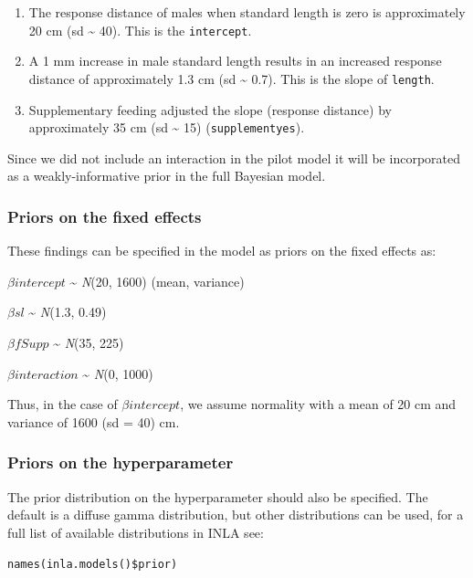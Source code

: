 \documentclass[
]{book}
\providecommand{\tightlist}{%
  \setlength{\itemsep}{0pt}\setlength{\parskip}{0pt}}
\begin{document}
\begin{enumerate}
\def\labelenumi{\arabic{enumi}.}
\tightlist
\item
  The response distance of males when standard length is zero is approximately 20 cm (sd \textasciitilde{} 40). This is the \texttt{intercept}.
\item
  A 1 mm increase in male standard length results in an increased response distance of approximately 1.3 cm (sd \textasciitilde{} 0.7). This is the slope of \texttt{length}.
\item
  Supplementary feeding adjusted the slope (response distance) by approximately 35 cm (sd \textasciitilde{} 15) (\texttt{supplementyes}).
\end{enumerate}

Since we did not include an interaction in the pilot model it will be incorporated as a weakly-informative prior in the full Bayesian model.

\hypertarget{priors-on-the-fixed-effects}{%
\subsubsection{Priors on the fixed effects}\label{priors-on-the-fixed-effects}}

These findings can be specified in the model as priors on the fixed effects as:

\(\beta intercept\) \textasciitilde{} \emph{N}(20, 1600) (mean, variance)

\(\beta sl\) \textasciitilde{} \emph{N}(1.3, 0.49)

\(\beta fSupp\) \textasciitilde{} \emph{N}(35, 225)

\(\beta interaction\) \textasciitilde{} \emph{N}(0, 1000)

Thus, in the case of \(\beta intercept\), we assume normality with a mean of 20 cm and variance of 1600 (sd = 40) cm.

\hypertarget{priors-on-the-hyperparameter}{%
\subsubsection{Priors on the hyperparameter}\label{priors-on-the-hyperparameter}}

The prior distribution on the hyperparameter should also be specified. The default is a diffuse gamma distribution, but other distributions can be used, for a full list of available distributions in INLA see:

\texttt{names(inla.models()\$prior)}
\end{document}
